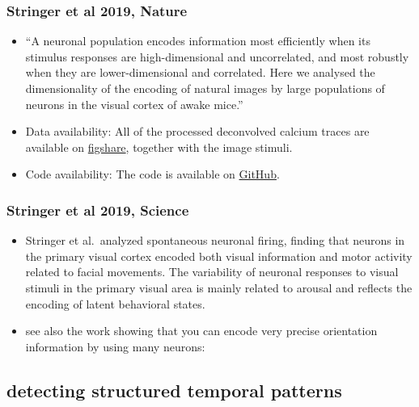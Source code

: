 \documentclass[brainsci, %
               review,submit,pdftex,moreauthors]{Definitions/mdpi}
\begin{document}
\subsubsection{Stringer et al 2019, Nature~\citep{stringer_high-dimensional_2019}}\label{stringer-et-al-2019-nature-stringer2019nature}
\begin{itemize}
 \item
  ``A neuronal population encodes information most efficiently when its stimulus responses are high-dimensional and uncorrelated, and most robustly when they are lower-dimensional and correlated. Here we analysed the dimensionality of the encoding of natural images by large populations of neurons in the visual cortex of awake mice.''
\item
  Data availability: All of the processed deconvolved calcium traces are available on \href{https://figshare.com/articles/Recordings_of_ten_thousand_neurons_in_visual_cortex_in_response_to_2_800_natural_images/6845348}{figshare}, together with the image stimuli.
\item
  Code availability: The code is available on \href{https://github.com/MouseLand/stringer-pachitariu-et-al-2018b}{GitHub}.
\end{itemize}

\subsubsection{Stringer et al 2019, Science~\citep{stringer_spontaneous_2019}}\label{stringer-et-al-2019-science-stringer2019science}
\begin{itemize}
\item
  Stringer et al.~analyzed spontaneous neuronal firing, finding that neurons in the primary visual cortex encoded both visual information and motor activity related to facial movements. The variability of neuronal responses to visual stimuli in the primary visual area is mainly related to arousal and reflects the encoding of latent behavioral states.
\item
  see also the work showing that you can encode very precise orientation information by using many neurons:~\citep{stringer_high-precision_2021}
\end{itemize}


\subsection{detecting structured temporal patterns}
\end{document}
